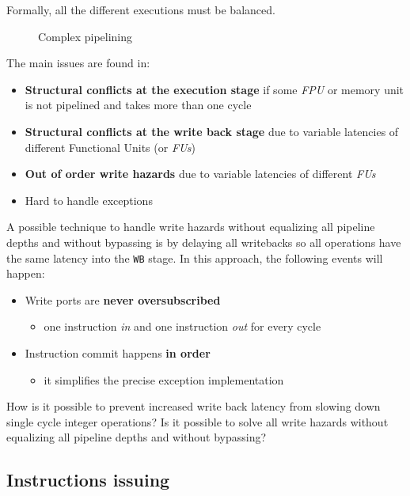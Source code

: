 \documentclass[english]{article}
\begin{document}
Formally, all the different executions must be balanced.

\begin{figure}[htbp]
  \bigskip
  \centering
  \caption{Complex pipelining}
  \label{fig:complex-pipelining-2}
  \bigskip
\end{figure}

\bigskip
The main issues are found in:
\begin{itemize}
  \item \textbf{Structural conflicts at the execution stage} if some \textit{FPU} or memory unit is not pipelined and takes more than one cycle
  \item \textbf{Structural conflicts at the write back stage} due to variable latencies of different Functional Units (or \textit{FUs})
  \item \textbf{Out of order write hazards} due to variable latencies of different \textit{FUs}
  \item Hard to handle exceptions
\end{itemize}

A possible technique to handle write hazards without equalizing all pipeline depths and without bypassing is by delaying all writebacks so all operations have the same latency into the \texttt{WB} stage.
In this approach, the following events will happen:

\begin{itemize}
  \item Write ports are \textbf{never oversubscribed}
        \begin{itemize}
          \item one instruction \textit{in} and one instruction \textit{out} for every cycle
        \end{itemize}
  \item Instruction commit happens \textbf{in order}
        \begin{itemize}
          \item it simplifies the precise exception implementation
        \end{itemize}
\end{itemize}

How is it possible to prevent increased write back latency from slowing down single cycle integer operations?
Is it possible to solve all write hazards without equalizing all pipeline depths and without bypassing?

\subsection{Instructions issuing}
\label{sec:instructions-issuing}
\end{document}

